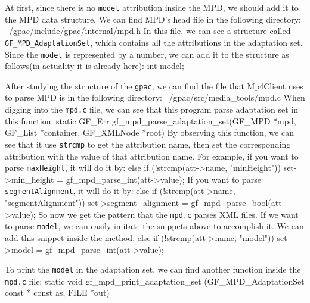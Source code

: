 \documentclass{article}%
\newenvironment{code}%
   {\snugshade\verbatim}%
   {\endverbatim\endsnugshade}
\begin{document}
\begin{Large}
At first, since there is no \texttt{model} attribution inside the MPD, we should add it to the MPD data structure. We can find MPD's head file in the following directory:
\begin{code}
    ~/gpac/include/gpac/internal/mpd.h
\end{code}
In this file, we can see a structure called \texttt{GF\_MPD\_AdaptationSet}, which contains all the attributions in the adaptation set. Since the \texttt{model} is represented by a number, we can add it to the structure as follows(in actuality it is already here):
\begin{code}
    int model;
\end{code}

After studying the structure of the \texttt{gpac}, we can find the file that Mp4Client uses to parse MPD is in the following directory:
\begin{code}
    ~/gpac/src/media_tools/mpd.c
\end{code}
When digging into the \texttt{mpd.c} file, we can see that this program parse adaptation set in this function:
\begin{code}
    static GF_Err gf_mpd_parse_adaptation_set(GF_MPD *mpd, 
        GF_List *container, GF_XMLNode *root)
\end{code}
By observing this function, we can see that it use \texttt{strcmp} to get the attribution name, then set the corresponding attribution with the value of that attribution name.
For example, if you want to parse \texttt{maxHeight}, it will do it by:
\begin{code}
    else if (!strcmp(att->name, "minHeight")) 
        set->min_height = gf_mpd_parse_int(att->value);
\end{code}
If you want to parse \texttt{segmentAlignment}, it will do it by:
\begin{code}
    else if (!strcmp(att->name, "segmentAlignment")) 
        set->segment_alignment = gf_mpd_parse_bool(att->value);
\end{code}
\newpage
So now we get the pattern that the \texttt{mpd.c} parses XML files. If we want to parse \texttt{model}, we can easily imitate the snippets above to accomplish it. We can add this snippet inside the method:
\begin{code}
    else if (!strcmp(att->name, "model")) 
        set->model = gf_mpd_parse_int(att->value);
\end{code}

To print the \texttt{model} in the adaptation set, we can find another function inside the \texttt{mpd.c} file:
\begin{code}
    static void gf_mpd_print_adaptation_set
        (GF_MPD_AdaptationSet const * const as, FILE *out)
\end{code}


\end{Large}
\end{document}
